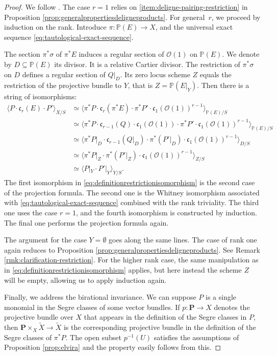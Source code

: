 \documentclass[11pt]{article}
\theoremstyle{plain}
\theoremstyle{definition}
\newcommand{\PBbb}{\mathbb P}
\newcommand{\Ocal}{\mathcal O}
\newcommand{\cfrak}{\mathfrak c}
\begin{document}
\begin{proof}
We follow \cite[\textsection V.4.10]{Elkikfib}. The case $r=1$ relies on \eqref{item:deligne-pairing-restriction} in Proposition \ref{prop:generalpropertiesdeligneproducts}. For general~$r$, we proceed by induction on the rank. Introduce $\pi\colon\PBbb(E)\to X$, and the universal exact sequence \eqref{eq:tautological-exact-sequence}.

The section $\pi^{\ast}\sigma$ of $\pi^{\ast}E$ induces a regular section of $\Ocal(1)$ on $\PBbb(E)$. We denote by $D\subseteq\PBbb(E)$ its divisor. It is a relative Cartier divisor. The restriction of $\pi^{\ast}\sigma$ on $D$ defines a regular section of $Q|_{D}$. Its zero locus scheme $Z$ equals the restriction of the projective bundle to $Y$, that is $Z=\PBbb(E|_Y)$. Then there is a string of isomorphisms:
\begin{equation}\label{eq:definitionrestrictionisomorphism}
\begin{split}
\langle P \cdot \cfrak_r(E) \cdot P' \rangle_{X/S} & \simeq \langle \pi^\ast P \cdot \cfrak_r(\pi^\ast E) \cdot \pi^\ast P' \cdot \cfrak_{1}(\Ocal(1))^{r-1} \rangle_{\PBbb(E)/S} \\
& \simeq \langle \pi^\ast P \cdot \cfrak_{r-1}(Q)\cdot \cfrak_{1}(\Ocal(1)) \cdot \pi^\ast P' \cdot \cfrak_{1}(\Ocal(1))^{r-1} \rangle_{\PBbb(E)/S} \\
& \simeq \langle \pi^{\ast}P|_{D} \cdot \cfrak_{r-1}(Q|_D) \cdot \pi^\ast (P'|_D )\cdot \cfrak_{1}(\Ocal(1))^{r-1} \rangle_{D/S} \\
& \simeq \langle \pi^{\ast}P|_{Z} \cdot \pi^\ast (P'|_Z )\cdot \cfrak_{1}(\Ocal(1))^{r-1} \rangle_{Z/S} \\
& \simeq \langle P|_{Y} \cdot P'|_Y \rangle_{Y/S}.
\end{split}
\end{equation}
The first isomorphism in \eqref{eq:definitionrestrictionisomorphism} is the second case of the projection formula. The second one is the Whitney isomorphism associated with \eqref{eq:tautological-exact-sequence} combined with the rank triviality. The third one uses the case $r=1$, and the fourth isomorphism is constructed by induction. The final one performs the projection formula again.

The argument for the case $Y=\emptyset$ goes along the same lines. The case of rank one again reduces to Proposition \ref{prop:generalpropertiesdeligneproducts}. See Remark \ref{rmk:clarification-restriction}. For the higher rank case, the same manipulation as in \eqref{eq:definitionrestrictionisomorphism} applies, but here instead the scheme $Z$ will be empty, allowing us to apply induction again.

Finally, we address the birational invariance. We can suppose $P$ is a single monomial in the Segre classes of some vector bundles. If $p: \mathbf{P} \to X$ denotes the projective bundle over $X$ that appears in the definition of the Segre classes in $P$, then $\mathbf{P} \times_X \widetilde{X} \to \widetilde{X}$ is the corresponding projective bundle in the definition of the Segre classes of $\pi^\ast P$. The open subset $p^{-1}(U)$ satisfies the assumptions of Proposition \ref{prop:elvira} and the property easily follows from this.
\end{proof}
\end{document}
